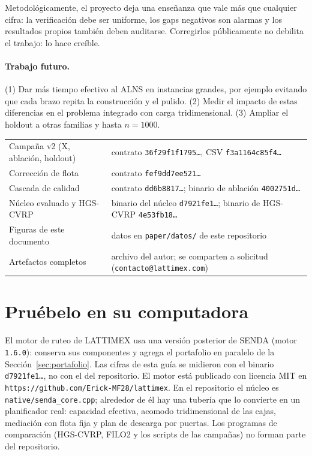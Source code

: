 \documentclass[11pt,a4paper]{article}
\newcommand{\tsl}[1]{\texttt{\small #1}}
\begin{document}
Metodológicamente, el proyecto deja una enseñanza que vale más que cualquier cifra: la verificación
debe ser uniforme, los gaps negativos son alarmas y los resultados propios también deben auditarse.
Corregirlos públicamente no debilita el trabajo: lo hace creíble.

\paragraph{Trabajo futuro.}
(1) Dar más tiempo efectivo al ALNS en instancias grandes, por ejemplo evitando que cada brazo repita
la construcción y el pulido.
(2) Medir el impacto de estas diferencias en el problema integrado con carga tridimensional.
(3) Ampliar el holdout a otras familias y hasta $n=1000$.

\begin{reproducir}[: artefactos]
\small
\begin{tabular}{@{}p{4.9cm}p{9.6cm}@{}}
Campaña v2 (X, ablación, holdout) & contrato \tsl{36f29f1f1795\ldots}, CSV \tsl{f3a1164c85f4\ldots} \\
Corrección de flota & contrato \tsl{fef9dd7ee521\ldots} \\
Cascada de calidad & contrato \tsl{dd6b8817\ldots}; binario de ablación \tsl{4002751d\ldots} \\
Núcleo evaluado y HGS-CVRP & binario del núcleo \tsl{d7921fe1\ldots}; binario de HGS-CVRP \tsl{4e53fb18\ldots} \\
Figuras de este documento & datos en \tsl{paper/datos/} de este repositorio \\
Artefactos completos & archivo del autor; se comparten a solicitud (\tsl{contacto@lattimex.com}) \\
\end{tabular}
\end{reproducir}


\section{Pruébelo en su computadora}
\label{sec:pruebalo}

El motor de ruteo de LATTIMEX usa una versión posterior de SENDA (motor \tsl{1.6.0}): conserva sus componentes y agrega el portafolio en paralelo de la Sección~\ref{sec:portafolio}. Las cifras de esta guía se midieron con el binario \tsl{d7921fe1\ldots}, no con el del repositorio. El motor está publicado con licencia MIT en
\texttt{https://github.com/Erick-MF28/lattimex}. En el repositorio el núcleo es
\tsl{native/senda\_core.cpp}; alrededor de él hay una tubería que lo convierte en un planificador real:
capacidad efectiva, acomodo tridimensional de las cajas, mediación con flota fija y plan de descarga
por puertas. Los programas de comparación (HGS-CVRP, FILO2 y los scripts de las campañas) no forman
parte del repositorio.
\end{document}

